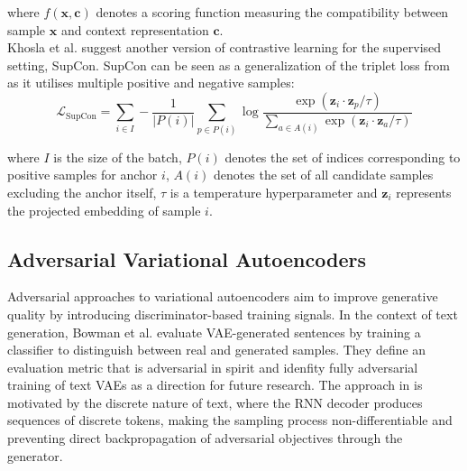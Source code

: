 \documentclass[Main.tex]{subfiles}
\begin{document}
where $f(\mathbf{x}, \mathbf{c})$ denotes a scoring function measuring the compatibility between sample $\mathbf{x}$ and context representation $\mathbf{c}$.\\

Khosla et al. \cite{khosla_supervised_2021} suggest another version of contrastive learning for the supervised setting, SupCon. SupCon can be seen as a generalization of the triplet loss from \cite{schroff_facenet_2015} as it utilises multiple positive and negative samples:
\begin{equation}
\mathcal{L}_{\mathrm{SupCon}}
=
\sum_{i \in I}
-\frac{1}{|P(i)|}
\sum_{p \in P(i)}
\log
\frac{
\exp(\mathbf{z}_i \cdot \mathbf{z}_p / \tau)
}{
\sum_{a \in A(i)}
\exp(\mathbf{z}_i \cdot \mathbf{z}_a / \tau)
}
\end{equation}

where $I$ is the size of the batch, $P(i)$ denotes the set of indices corresponding to positive samples for anchor $i$, $A(i)$ denotes the set of all candidate samples excluding the anchor itself, $\tau$ is a temperature hyperparameter and $\mathbf{z}_i$ represents the projected embedding of sample $i$.\\

\subsection{Adversarial Variational Autoencoders}

Adversarial approaches to variational autoencoders aim to improve generative quality by introducing discriminator-based training signals. In the context of text generation, Bowman et al. \cite{bowman_generating_2016} evaluate VAE-generated sentences by training a classifier to distinguish between real and generated samples. They define an evaluation metric that is adversarial in spirit and idenfity fully adversarial training of text VAEs as a direction for future research. The approach in \cite{bowman_generating_2016} is motivated by the discrete nature of text, where the RNN decoder produces sequences of discrete tokens, making the sampling process non-differentiable and preventing direct backpropagation of adversarial objectives through the generator.\\
\end{document}
